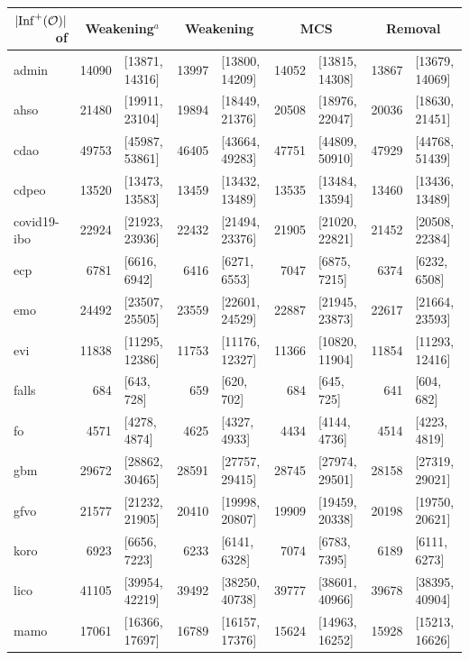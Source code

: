 \begin{table}[htbp]
  \scriptsize
  \centering
  \begin{tabular}{|l|r@{ }lr@{ }lr@{ }lr@{ }l|}
    \cline{2-9}
    \multicolumn{1}{r|}{$|{\operatorname{Inf}}^+(\mathcal{O})|$ of} & \multicolumn{2}{c}{Weakening$^a$} & \multicolumn{2}{c}{Weakening} & \multicolumn{2}{c}{MCS} & \multicolumn{2}{c|}{Removal} \\
    \hline
    admin & 14090 & [13871, 14316] & 13997 & [13800, 14209] & 14052 & [13815, 14308] & 13867 & [13679, 14069] \\
    ahso & 21480 & [19911, 23104] & 19894 & [18449, 21376] & 20508 & [18976, 22047] & 20036 & [18630, 21451] \\
    cdao & 49753 & [45987, 53861] & 46405 & [43664, 49283] & 47751 & [44809, 50910] & 47929 & [44768, 51439] \\
    cdpeo & 13520 & [13473, 13583] & 13459 & [13432, 13489] & 13535 & [13484, 13594] & 13460 & [13436, 13489] \\
    covid19-ibo & 22924 & [21923, 23936] & 22432 & [21494, 23376] & 21905 & [21020, 22821] & 21452 & [20508, 22384] \\
    ecp & 6781 & [6616, 6942] & 6416 & [6271, 6553] & 7047 & [6875, 7215] & 6374 & [6232, 6508] \\
    emo & 24492 & [23507, 25505] & 23559 & [22601, 24529] & 22887 & [21945, 23873] & 22617 & [21664, 23593] \\
    evi & 11838 & [11295, 12386] & 11753 & [11176, 12327] & 11366 & [10820, 11904] & 11854 & [11293, 12416] \\
    falls & 684 & [643, 728] & 659 & [620, 702] & 684 & [645, 725] & 641 & [604, 682] \\
    fo & 4571 & [4278, 4874] & 4625 & [4327, 4933] & 4434 & [4144, 4736] & 4514 & [4223, 4819] \\
    gbm & 29672 & [28862, 30465] & 28591 & [27757, 29415] & 28745 & [27974, 29501] & 28158 & [27319, 29021] \\
    gfvo & 21577 & [21232, 21905] & 20410 & [19998, 20807] & 19909 & [19459, 20338] & 20198 & [19750, 20621] \\
    koro & 6923 & [6656, 7223] & 6233 & [6141, 6328] & 7074 & [6783, 7395] & 6189 & [6111, 6273] \\
    lico & 41105 & [39954, 42219] & 39492 & [38250, 40738] & 39777 & [38601, 40966] & 39678 & [38395, 40904] \\
    mamo & 17061 & [16366, 17697] & 16789 & [16157, 17376] 
    & 15624 & [14963, 16252] & 15928 & [15213, 16626] \\

\end{tabular}
\end{table}
